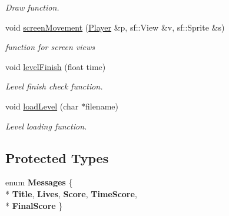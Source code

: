 \begin{DoxyCompactItemize}
\begin{DoxyCompactList}\small\item\em Draw function. \end{DoxyCompactList}\item 
void \hyperlink{class_game_play_a474ed6cf3fcfd1426bfed9c88f24c83c}{screen\-Movement} (\hyperlink{class_player}{Player} \&p, sf\-::\-View \&v, sf\-::\-Sprite \&s)
\begin{DoxyCompactList}\small\item\em function for screen views \end{DoxyCompactList}\item 
void \hyperlink{class_game_play_a8e2237eb9247de338d23c832a7a3e48d}{level\-Finish} (float time)
\begin{DoxyCompactList}\small\item\em Level finish check function. \end{DoxyCompactList}\item 
void \hyperlink{class_game_play_af855db71ec71c4910376ae3cb23fd6fb}{load\-Level} (char $\ast$filename)
\begin{DoxyCompactList}\small\item\em Level loading function. \end{DoxyCompactList}\end{DoxyCompactItemize}
\subsection*{Protected Types}
\begin{DoxyCompactItemize}
\item 
enum {\bfseries Messages} \{ \\*
{\bfseries Title}, 
{\bfseries Lives}, 
{\bfseries Score}, 
{\bfseries Time\-Score}, 
\\*
{\bfseries Final\-Score}
 \}
\end{DoxyCompactItemize}
